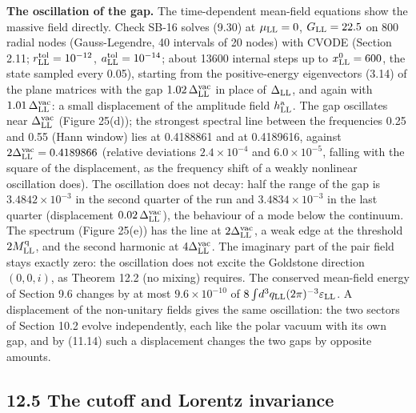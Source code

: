 \documentclass[
  10pt,
]{article}
\begin{document}
\textbf{The oscillation of the gap.} The time-dependent mean-field
equations show the massive field directly. Check SB-16 solves (9.30) at
\(\mu_{\rm LL}=0\), \(G_{\rm LL}=22.5\) on 800 radial nodes
(Gauss-Legendre, 40 intervals of 20 nodes) with CVODE (Section 2.11;
\(r^{\rm tol}_{\rm LL}=10^{-12}\), \(a^{\rm tol}_{\rm LL}=10^{-14}\);
about 13600 internal steps up to \(x^0_{\rm LL}=600\), the state sampled
every 0.05), starting from the positive-energy eigenvectors (3.14) of
the plane matrices with the gap \(1.02\,\Delta^{\rm vac}_{\rm LL}\) in
place of \(\Delta_{\rm LL}\), and again with
\(1.01\,\Delta^{\rm vac}_{\rm LL}\): a small displacement of the
amplitude field \(h^{\rm a}_{\rm LL}\). The gap oscillates near
\(\Delta^{\rm vac}_{\rm LL}\) (Figure 25(d)); the strongest spectral
line between the frequencies 0.25 and 0.55 (Hann window) lies at
0.4188861 and at 0.4189616, against
\(2\Delta^{\rm vac}_{\rm LL}=0.4189866\) (relative deviations
\(2.4\times10^{-4}\) and \(6.0\times10^{-5}\), falling with the square
of the displacement, as the frequency shift of a weakly nonlinear
oscillation does). The oscillation does not decay: half the range of the
gap is \(3.4842\times10^{-3}\) in the second quarter of the run and
\(3.4834\times10^{-3}\) in the last quarter (displacement
\(0.02\,\Delta^{\rm vac}_{\rm LL}\)), the behaviour of a mode below the
continuum. The spectrum (Figure 25(e)) has the line at
\(2\Delta^{\rm vac}_{\rm LL}\), a weak edge at the threshold
\(2M^{\rm q}_{\rm LL}\), and the second harmonic at
\(4\Delta^{\rm vac}_{\rm LL}\). The imaginary part of the pair field
stays exactly zero: the oscillation does not excite the Goldstone
direction \((0,0,i)\), as Theorem 12.2 (no mixing) requires. The
conserved mean-field energy of Section 9.6 changes by at most
\(9.6\times10^{-10}\) of
\(8\int\!d^3q_{\rm LL}(2\pi)^{-3}\varepsilon_{\rm LL}\). A displacement
of the non-unitary fields gives the same oscillation: the two sectors of
Section 10.2 evolve independently, each like the polar vacuum with its
own gap, and by (11.14) such a displacement changes the two gaps by
opposite amounts.

\hypertarget{the-cutoff-and-lorentz-invariance}{%
\subsection{12.5 The cutoff and Lorentz
invariance}\label{the-cutoff-and-lorentz-invariance}}
\end{document}
